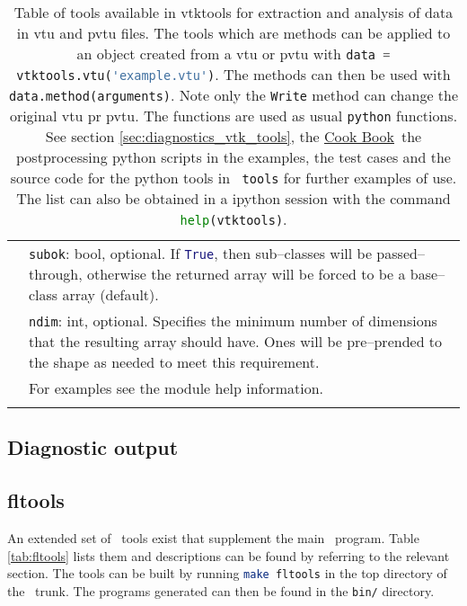 \begin{landscape}
\begin{longtable}{|c | p{} |p{}|}
& \multicolumn{2}{p{1.05\textwidth}|}{\lstinline[language=Python]+subok+: bool, optional. If \lstinline[language=Python]+True+, then sub--classes will be passed--through, otherwise the returned array will be forced to be a base--class array (default).} \\
& \multicolumn{2}{p{1.05\textwidth}|}{\lstinline[language=Python]+ndim+: int, optional. Specifies the minimum number of dimensions that the resulting array should have. Ones will be pre--prended to the shape as needed to meet this requirement.} \\
& \multicolumn{2}{p{1.05\textwidth}|}{For examples see the module help information.} \\ \hline

%
%
%
\caption[Table of vtktools]{Table of tools available in vtktools for extraction and analysis of data in vtu and pvtu files. The tools which are methods can be applied to an object created from a vtu or pvtu with \lstinline[language=Python]+data = vtktools.vtu('example.vtu')+. The methods can then be used with \lstinline[language=Python]+data.method(arguments)+. Note only the \lstinline[language=Python]+Write+ method can change the original vtu pr pvtu. The functions are used as usual \lstinline[language=Python]+python+ functions. See section \ref{sec:diagnostics_vtk_tools}, the \href{http://amcg.ese.ic.ac.uk/index.php?title=Cook_Book}{Cook Book}\, the postprocessing python scripts in the examples, the test cases and the source code for the python tools in \lstinline[language = bash]+ tools+ for further examples of use. The list can also be obtained in a ipython session with the command \lstinline[language=Python]+help(vtktools)+.}
\label{table:vtktools_list}
\end{longtable}
\end{landscape}

\subsection{Diagnostic output}
\label{sec:diagnostic_output}

\subsection{fltools}
\label{sec:fltools}
An extended set of \fluidity\ tools exist that supplement the main
\fluidity\ program. Table \ref{tab:fltools} lists them and descriptions can
be found by referring to the relevant section. The tools can be built by
running \lstinline[language = bash]+make fltools+ in the top directory of
the \fluidity\ trunk. The programs generated can then be found in the
\lstinline[language = bash]+bin/+ directory.

